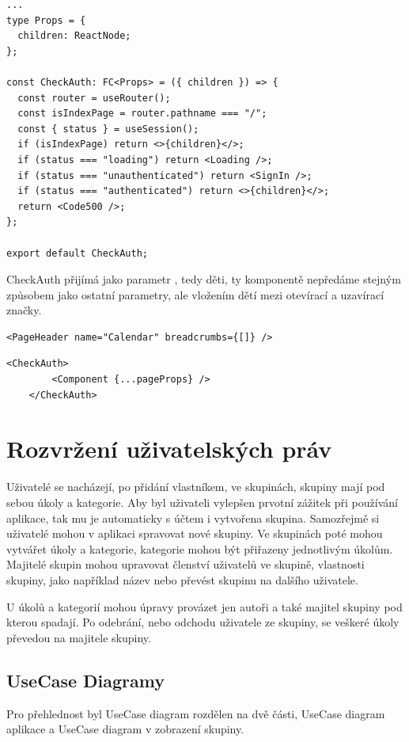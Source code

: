 \begin{lstlisting}[caption=Komponenta CheckAuth]
...
type Props = {
  children: ReactNode;
};

const CheckAuth: FC<Props> = ({ children }) => {
  const router = useRouter();
  const isIndexPage = router.pathname === "/";
  const { status } = useSession();
  if (isIndexPage) return <>{children}</>;
  if (status === "loading") return <Loading />;
  if (status === "unauthenticated") return <SignIn />;
  if (status === "authenticated") return <>{children}</>;
  return <Code500 />;
};

export default CheckAuth;

\end{lstlisting}
CheckAuth přijímá jako parametr , tedy děti, ty komponentě nepředáme stejným způsobem jako ostatní parametry, ale vložením dětí mezi otevírací a uzavírací značky.
\begin{lstlisting}[caption=Standardní předání parametrů komponentě]
    <PageHeader name="Calendar" breadcrumbs={[]} />
\end{lstlisting}
\begin{lstlisting}[caption=Předání dětí komponentě]
    <CheckAuth>
        <Component {...pageProps} />
    </CheckAuth>
\end{lstlisting}
\section{Rozvržení uživatelských práv}
Uživatelé se nacházejí, po přidání vlastníkem, ve skupinách, skupiny mají pod sebou úkoly a kategorie. Aby byl uživateli vylepšen prvotní zážitek při používání aplikace, tak mu je automaticky s účtem i vytvořena skupina. Samozřejmě si uživatelé mohou v aplikaci spravovat nové skupiny. Ve skupinách poté mohou vytvářet úkoly a kategorie, kategorie mohou být přiřazeny jednotlivým úkolům. Majitelé skupin mohou upravovat členství uživatelů ve skupině, vlastnosti skupiny, jako například název nebo převést skupinu na dalšího uživatele. 

U úkolů a kategorií mohou úpravy provázet jen autoři a také majitel skupiny pod kterou spadají. Po odebrání, nebo odchodu uživatele ze skupiny, se veškeré úkoly převedou na majitele skupiny. 
\newpage
\subsection{UseCase Diagramy}
Pro přehlednost byl UseCase diagram rozdělen na dvě části, UseCase diagram aplikace a UseCase diagram v zobrazení skupiny.

